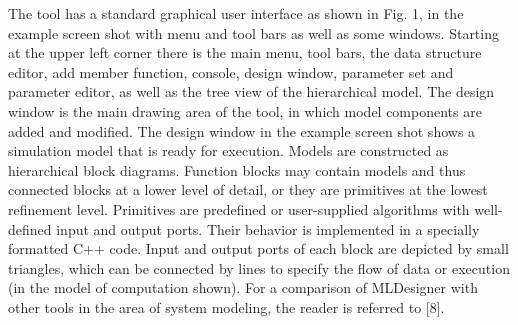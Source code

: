 The tool has a standard graphical user interface as shown
in Fig. 1, in the example screen shot with menu and tool bars
as well as some windows. Starting at the upper left corner
there is the main menu, tool bars, the data structure editor, add
member function, console, design window, parameter set and
parameter editor, as well as the tree view of the hierarchical
model. The design window is the main drawing area of the
tool, in which model components are added and modified. The
design window in the example screen shot shows a simulation
model that is ready for execution. Models are constructed
as hierarchical block diagrams. Function blocks may contain
models and thus connected blocks at a lower level of detail, or
they are primitives at the lowest refinement level. Primitives
are predefined or user-supplied algorithms with well-defined
input and output ports. Their behavior is implemented in a
specially formatted C++ code. Input and output ports of each
block are depicted by small triangles, which can be connected
by lines to specify the flow of data or execution (in the model
of computation shown).
For a comparison of MLDesigner with other tools in the
area of system modeling, the reader is referred to [8].